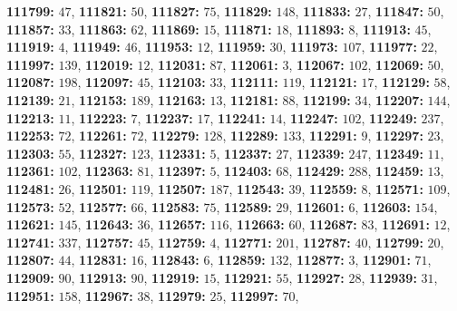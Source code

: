 \textsf{\bfseries 111799:} $47$, \textsf{\bfseries 111821:} $50$, \textsf{\bfseries 111827:} $75$, \textsf{\bfseries 111829:} $148$, \textsf{\bfseries 111833:} $27$, \textsf{\bfseries 111847:} $50$, \textsf{\bfseries 111857:} $33$, \textsf{\bfseries 111863:} $62$, \textsf{\bfseries 111869:} $15$, \textsf{\bfseries 111871:} $18$, \textsf{\bfseries 111893:} $8$, \textsf{\bfseries 111913:} $45$, \textsf{\bfseries 111919:} $4$, \textsf{\bfseries 111949:} $46$, \textsf{\bfseries 111953:} $12$, \textsf{\bfseries 111959:} $30$, \textsf{\bfseries 111973:} $107$, \textsf{\bfseries 111977:} $22$, \textsf{\bfseries 111997:} $139$, \textsf{\bfseries 112019:} $12$, \textsf{\bfseries 112031:} $87$, \textsf{\bfseries 112061:} $3$, \textsf{\bfseries 112067:} $102$, \textsf{\bfseries 112069:} $50$, \textsf{\bfseries 112087:} $198$, \textsf{\bfseries 112097:} $45$, \textsf{\bfseries 112103:} $33$, \textsf{\bfseries 112111:} $119$, \textsf{\bfseries 112121:} $17$, \textsf{\bfseries 112129:} $58$, \textsf{\bfseries 112139:} $21$, \textsf{\bfseries 112153:} $189$, \textsf{\bfseries 112163:} $13$, \textsf{\bfseries 112181:} $88$, \textsf{\bfseries 112199:} $34$, \textsf{\bfseries 112207:} $144$, \textsf{\bfseries 112213:} $11$, \textsf{\bfseries 112223:} $7$, \textsf{\bfseries 112237:} $17$, \textsf{\bfseries 112241:} $14$, \textsf{\bfseries 112247:} $102$, \textsf{\bfseries 112249:} $237$, \textsf{\bfseries 112253:} $72$, \textsf{\bfseries 112261:} $72$, \textsf{\bfseries 112279:} $128$, \textsf{\bfseries 112289:} $133$, \textsf{\bfseries 112291:} $9$, \textsf{\bfseries 112297:} $23$, \textsf{\bfseries 112303:} $55$, \textsf{\bfseries 112327:} $123$, \textsf{\bfseries 112331:} $5$, \textsf{\bfseries 112337:} $27$, \textsf{\bfseries 112339:} $247$, \textsf{\bfseries 112349:} $11$, \textsf{\bfseries 112361:} $102$, \textsf{\bfseries 112363:} $81$, \textsf{\bfseries 112397:} $5$, \textsf{\bfseries 112403:} $68$, \textsf{\bfseries 112429:} $288$, \textsf{\bfseries 112459:} $13$, \textsf{\bfseries 112481:} $26$, \textsf{\bfseries 112501:} $119$, \textsf{\bfseries 112507:} $187$, \textsf{\bfseries 112543:} $39$, \textsf{\bfseries 112559:} $8$, \textsf{\bfseries 112571:} $109$, \textsf{\bfseries 112573:} $52$, \textsf{\bfseries 112577:} $66$, \textsf{\bfseries 112583:} $75$, \textsf{\bfseries 112589:} $29$, \textsf{\bfseries 112601:} $6$, \textsf{\bfseries 112603:} $154$, \textsf{\bfseries 112621:} $145$, \textsf{\bfseries 112643:} $36$, \textsf{\bfseries 112657:} $116$, \textsf{\bfseries 112663:} $60$, \textsf{\bfseries 112687:} $83$, \textsf{\bfseries 112691:} $12$, \textsf{\bfseries 112741:} $337$, \textsf{\bfseries 112757:} $45$, \textsf{\bfseries 112759:} $4$, \textsf{\bfseries 112771:} $201$, \textsf{\bfseries 112787:} $40$, \textsf{\bfseries 112799:} $20$, \textsf{\bfseries 112807:} $44$, \textsf{\bfseries 112831:} $16$, \textsf{\bfseries 112843:} $6$, \textsf{\bfseries 112859:} $132$, \textsf{\bfseries 112877:} $3$, \textsf{\bfseries 112901:} $71$, \textsf{\bfseries 112909:} $90$, \textsf{\bfseries 112913:} $90$, \textsf{\bfseries 112919:} $15$, \textsf{\bfseries 112921:} $55$, \textsf{\bfseries 112927:} $28$, \textsf{\bfseries 112939:} $31$, \textsf{\bfseries 112951:} $158$, \textsf{\bfseries 112967:} $38$, \textsf{\bfseries 112979:} $25$, \textsf{\bfseries 112997:} $70$, 
